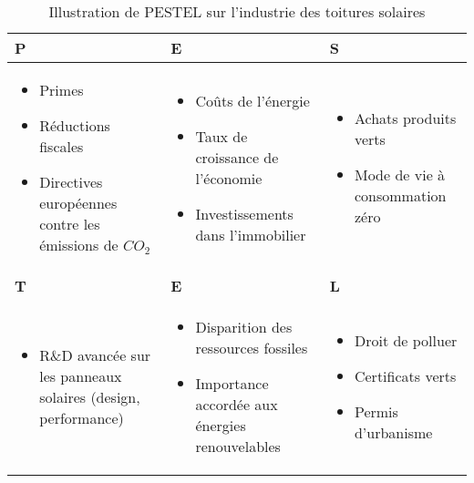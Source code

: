     \begin{table}[!ht]
      \begin{center}
	\begin{tabular}{|>{\centering\arraybackslash}P{5cm}||>{\centering\arraybackslash}P{5cm}||>{\centering\arraybackslash}P{5cm}|}
	 \hline
	   \textbf{P} &  \textbf{E} & \textbf{S} \\ \hline
	  \begin{itemize} 
	  \item Primes 
	  \item Réductions fiscales 
	  \item Directives européennes contre les émissions de $CO_{2}$
	  \end{itemize}
	  & 
	  \begin{itemize} 
	  \item Coûts de l'énergie
	  \item Taux de croissance de l'économie
	  \item Investissements dans l'immobilier
	  \end{itemize}
	  & 
	  \begin{itemize}
	  \item Achats produits verts
	  \item Mode de vie à consommation zéro
	  \end{itemize} \\  \hline
	   \textbf{T} &  \textbf{E} & \textbf{L} \\ \hline
	  \begin{itemize}
	   \item R\&D avancée sur les panneaux solaires (design, performance)
	  \end{itemize}
	  &
	  \begin{itemize}
	   \item Disparition des ressources fossiles
	   \item Importance accordée aux énergies renouvelables
	  \end{itemize}
	  &
	  \begin{itemize}
	   \item Droit de polluer
	   \item Certificats verts
	   \item Permis d'urbanisme
	  \end{itemize} \\ \hline
	  
	\end{tabular}
	
	\caption{Illustration de PESTEL sur l'industrie des toitures solaires}
      \end{center}
    \end{table}
    
